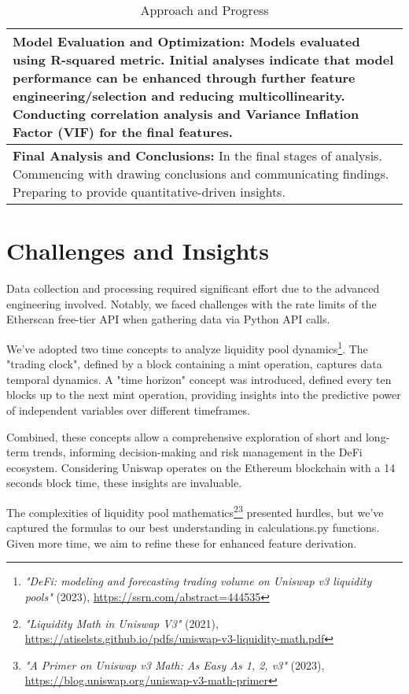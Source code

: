 \documentclass{article}
\begin{document}
{\begin{table}[htbp]
\begin{tabularx}{\linewidth}{|>{\raggedright\arraybackslash}X|}
\hline
\textbf{Model Evaluation and Optimization:} Models evaluated using R-squared metric. Initial analyses indicate that model performance can be enhanced through further feature engineering/selection and reducing multicollinearity. Conducting correlation analysis and Variance Inflation Factor (VIF) for the final features. \\
\hline
\textbf{Final Analysis and Conclusions:} In the final stages of analysis. Commencing with drawing conclusions and communicating findings. Preparing to provide quantitative-driven insights. \\
\hline
\end{tabularx}
\caption{Approach and Progress}
\label{fig:approach-progress}
\end{table}



\vspace{-2em} %
\section*{Challenges and Insights}

Data collection and processing required significant effort due to the advanced engineering involved. Notably, we faced challenges with the rate limits of the Etherscan free-tier API when gathering data via Python API calls.

We've adopted two time concepts to analyze liquidity pool dynamics\footnote{\textit{"DeFi: modeling and forecasting trading volume on Uniswap v3 liquidity pools"} (2023), \url{https://ssrn.com/abstract=444535}}. The "trading clock", defined by a block containing a mint operation, captures data temporal dynamics. A "time horizon" concept was introduced, defined every ten blocks up to the next mint operation, providing insights into the predictive power of independent variables over different timeframes.

Combined, these concepts allow a comprehensive exploration of short and long-term trends, informing decision-making and risk management in the DeFi ecosystem. Considering Uniswap operates on the Ethereum blockchain with a 14 seconds block time, these insights are invaluable.

The complexities of liquidity pool mathematics\footnote{\textit{"Liquidity Math in Uniswap V3"} (2021), \url{https://atiselsts.github.io/pdfs/uniswap-v3-liquidity-math.pdf}}\footnote{\textit{"A Primer on Uniswap v3 Math: As Easy As 1, 2, v3"} (2023), \url{https://blog.uniswap.org/uniswap-v3-math-primer}} presented hurdles, but we've captured the formulas to our best understanding in calculations.py functions. Given more time, we aim to refine these for enhanced feature derivation.



}
\end{document}
